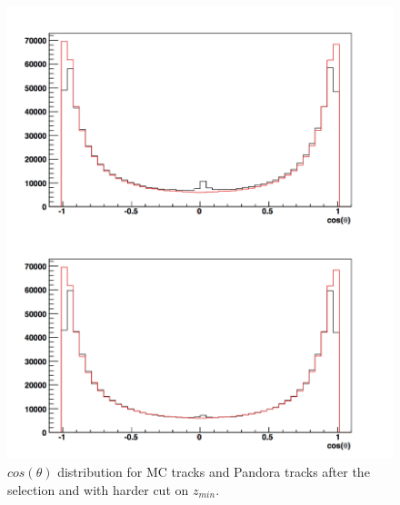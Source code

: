 \documentclass[a4paper,12pt]{article}
\begin{document}
\noindent
\begin{minipage}{\linewidth}
\centering
\begin{minipage}{0.4\linewidth}
\begin{figure}[H]
    \includegraphics[width=\linewidth]{Comp_alltrk_Pandoratrk_toMC_wocurlers.png} 
 \caption{$cos(\theta)$ distribution for MC tracks and Pandora tracks after the selection and with harder cut on $z_{min}$.}
   \label{fig:trk_para_mc_reco}
\end{figure}
\end{minipage}
      \hspace{0.05\linewidth}
      \begin{minipage}{0.4\linewidth}
\begin{figure}[H]

\end{figure}
\end{minipage}
\end{minipage}
\end{document}

